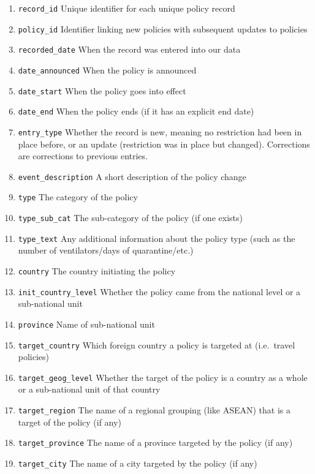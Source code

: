 \documentclass[]{article}
\providecommand{\tightlist}{%
  \setlength{\itemsep}{0pt}\setlength{\parskip}{0pt}}
\begin{document}
\begin{enumerate}
\def\labelenumi{\arabic{enumi}.}
\tightlist
\item
  \texttt{record\_id} Unique identifier for each unique policy record
\item
  \texttt{policy\_id} Identifier linking new policies with subsequent updates to policies
\item
  \texttt{recorded\_date} When the record was entered into our data
\item
  \texttt{date\_announced} When the policy is announced
\item
  \texttt{date\_start} When the policy goes into effect
\item
  \texttt{date\_end} When the policy ends (if it has an explicit end date)
\item
  \texttt{entry\_type} Whether the record is new, meaning no restriction had been in place before, or an update (restriction was in place but changed). Corrections are corrections to previous entries.
\item
  \texttt{event\_description} A short description of the policy change
\item
  \texttt{type} The category of the policy
\item
  \texttt{type\_sub\_cat} The sub-category of the policy (if one exists)
\item
  \texttt{type\_text} Any additional information about the policy type (such as the number of ventilators/days of quarantine/etc.)
\item
  \texttt{country} The country initiating the policy
\item
  \texttt{init\_country\_level} Whether the policy came from the national level or a sub-national unit
\item
  \texttt{province} Name of sub-national unit
\item
  \texttt{target\_country} Which foreign country a policy is targeted at (i.e.~travel policies)
\item
  \texttt{target\_geog\_level} Whether the target of the policy is a country as a whole or a sub-national unit of that country
\item
  \texttt{target\_region} The name of a regional grouping (like ASEAN) that is a target of the policy (if any)
\item
  \texttt{target\_province} The name of a province targeted by the policy (if any)
\item
  \texttt{target\_city} The name of a city targeted by the policy (if any)

\end{enumerate}
\end{document}

